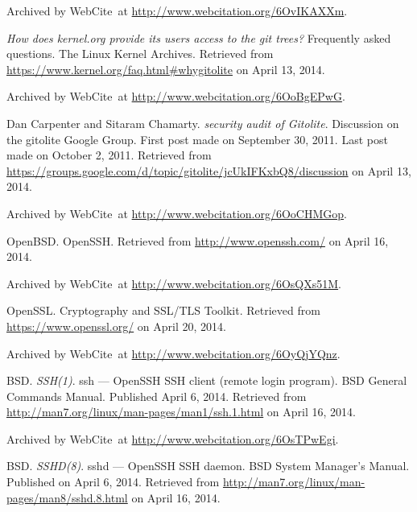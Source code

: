 \begin{thebibliography}{9}
Archived by WebCite\textsuperscript{\textregistered}\ at
\url{http://www.webcitation.org/6OvIKAXXm}.


\emph{How does kernel.org provide its users access to the git trees?}
Frequently asked questions. The Linux Kernel Archives. Retrieved from
\url{https://www.kernel.org/faq.html#whygitolite} on April 13, 2014.

Archived by WebCite\textsuperscript{\textregistered}\ at
\url{http://www.webcitation.org/6OoBgEPwG}.


Dan Carpenter and Sitaram Chamarty. \emph{security audit of Gitolite}.
Discussion on the gitolite Google Group.  First post made on September 30,
2011. Last post made on October 2, 2011. Retrieved from
\url{https://groups.google.com/d/topic/gitolite/jcUkIFKxbQ8/discussion} on
April 13, 2014.

Archived by WebCite\textsuperscript{\textregistered}\ at
\url{http://www.webcitation.org/6OoCHMGop}.


OpenBSD. OpenSSH. Retrieved from \url{http://www.openssh.com/} on April 16,
2014.

Archived by WebCite\textsuperscript{\textregistered}\ at
\url{http://www.webcitation.org/6OsQXs51M}.


OpenSSL. Cryptography and SSL/TLS Toolkit. Retrieved from
\url{https://www.openssl.org/} on April 20, 2014.

Archived by WebCite\textsuperscript{\textregistered}\ at
\url{http://www.webcitation.org/6OyQjYQnz}.


BSD. \emph{SSH(1)}. ssh — OpenSSH SSH client (remote login program). BSD
General Commands Manual. Published April 6, 2014.  Retrieved from
\url{http://man7.org/linux/man-pages/man1/ssh.1.html} on April 16, 2014.

Archived by WebCite\textsuperscript{\textregistered}\ at
\url{http://www.webcitation.org/6OsTPwEgi}.


BSD. \emph{SSHD(8)}. sshd --- OpenSSH SSH daemon. BSD System Manager's Manual.
Published on April 6, 2014. Retrieved from
\url{http://man7.org/linux/man-pages/man8/sshd.8.html} on April 16, 2014.


\end{thebibliography}
